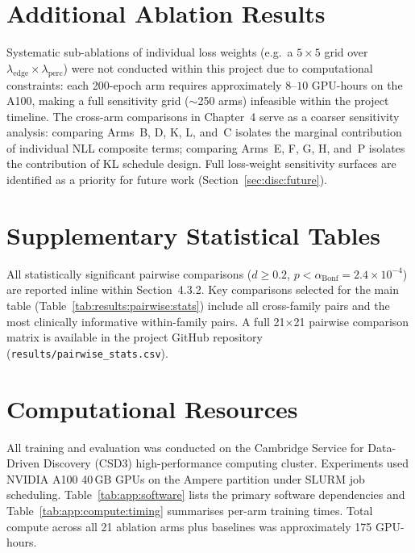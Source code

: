 \documentclass[12pt, a4paper, twoside, openright]{book}
\begin{document}
\begin{appendices}
\chapter{Additional Ablation Results}
\label{app:ablations}

Systematic sub-ablations of individual loss weights (e.g.\ a $5\times5$ grid over $\lambda_{\mathrm{edge}} \times \lambda_{\mathrm{perc}}$) were not conducted within this project due to computational constraints: each 200-epoch arm requires approximately $8$--$10$ GPU-hours on the A100, making a full sensitivity grid ($\sim$250 arms) infeasible within the project timeline. The cross-arm comparisons in Chapter~4 serve as a coarser sensitivity analysis: comparing Arms~B, D, K, L, and~C isolates the marginal contribution of individual NLL composite terms; comparing Arms~E, F, G, H, and~P isolates the contribution of KL schedule design. Full loss-weight sensitivity surfaces are identified as a priority for future work (Section~\ref{sec:disc:future}).

\chapter{Supplementary Statistical Tables}
\label{app:suptables}

All statistically significant pairwise comparisons ($d \geq 0.2$, $p < \alpha_{\mathrm{Bonf}} = 2.4 \times 10^{-4}$) are reported inline within Section~4.3.2. Key comparisons selected for the main table (Table~\ref{tab:results:pairwise:stats}) include all cross-family pairs and the most clinically informative within-family pairs. A full 21$\times$21 pairwise comparison matrix is available in the project GitHub repository (\texttt{results/pairwise\_stats.csv}).

\chapter{Computational Resources}
\label{app:compute}

All training and evaluation was conducted on the Cambridge Service for Data-Driven Discovery (CSD3) high-performance computing cluster. Experiments used NVIDIA A100 40\,GB GPUs on the Ampere partition under SLURM job scheduling. Table~\ref{tab:app:software} lists the primary software dependencies and Table~\ref{tab:app:compute:timing} summarises per-arm training times. Total compute across all 21 ablation arms plus baselines was approximately 175 GPU-hours.


\end{appendices}
\end{document}
